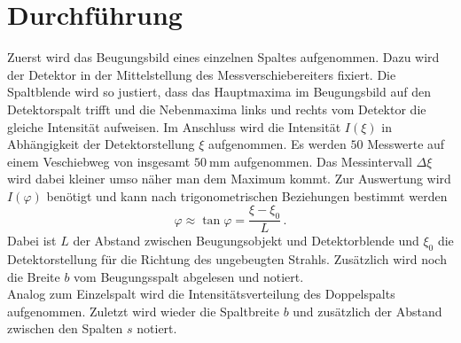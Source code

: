 \section{Durchführung}
\label{sec:Durchführung}
Zuerst wird das Beugungsbild eines einzelnen Spaltes aufgenommen.
Dazu wird der Detektor in der Mittelstellung des Messverschiebereiters fixiert.
Die Spaltblende wird so justiert, dass das Hauptmaxima im Beugungsbild auf den Detektorspalt trifft und die Nebenmaxima links und rechts vom Detektor die gleiche Intensität aufweisen.
Im Anschluss wird die Intensität $I(\xi)$ in Abhängigkeit der Detektorstellung $\xi$ aufgenommen.
Es werden $50$ Messwerte auf einem Veschiebweg von insgesamt $\SI{50}{\milli\metre}$ aufgenommen.
Das Messintervall $\Delta \xi$ wird dabei kleiner umso näher man dem Maximum kommt.
Zur Auswertung wird $I(\varphi)$ benötigt und kann nach trigonometrischen Beziehungen bestimmt werden
\begin{equation}
    \varphi \approx \tan \varphi = \frac{\xi - \xi_0}{L} \, .
\end{equation} 
Dabei ist $L$ der Abstand zwischen Beugungsobjekt und Detektorblende und $\xi_0$ die Detektorstellung für die Richtung des ungebeugten Strahls.
Zusätzlich wird noch die Breite $b$ vom Beugungsspalt abgelesen und notiert.
\\
Analog zum Einzelspalt wird die Intensitätsverteilung des Doppelspalts aufgenommen.
Zuletzt wird wieder die Spaltbreite $b$ und zusätzlich der Abstand zwischen den Spalten $s$ notiert.